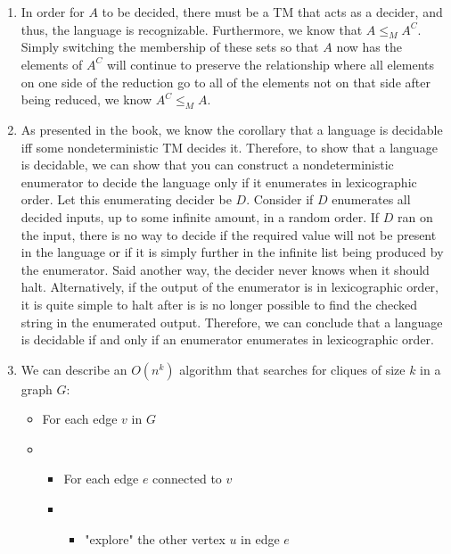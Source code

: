 



\begin{enumerate}
    \item In order for $A$ to be decided, there must be a TM that acts as a decider, and thus, the language is recognizable. Furthermore, we know that $A \leq_M A^C$. Simply switching the membership of these sets so that $A$ now has the elements of $A^C$ will continue to preserve the relationship where all elements on one side of the reduction go to all of the elements not on that side after being reduced, we know $A^C \leq_M A$.

    \item As presented in the book, we know the corollary that a language is decidable iff some nondeterministic TM decides it. Therefore, to show that a language is decidable, we can show that you can construct a nondeterministic enumerator to decide the language only if it enumerates in lexicographic order. Let this enumerating decider be $D$. Consider if $D$ enumerates all decided inputs, up to some infinite amount, in a random order. If $D$ ran on the input, there is no way to decide if the required value will not be present in the language or if it is simply further in the infinite list being produced by the enumerator. Said another way, the decider never knows when it should halt. Alternatively, if the output of the enumerator is in lexicographic order, it is quite simple to halt after is is no longer possible to find the checked string in the enumerated output. Therefore, we can conclude that a language is decidable if and only if an enumerator enumerates in lexicographic order.

    \item We can describe an $O(n^k)$ algorithm that searches for cliques of size $k$ in a graph $G$:
    \begin{itemize}
        \item For each edge $v$ in $G$

        \item \begin{itemize}
            \item For each edge $e$ connected to $v$

            \item \begin{itemize}
                \item "explore" the other vertex $u$ in edge $e$


\end{itemize}
\end{itemize}
\end{itemize}
\end{enumerate}
